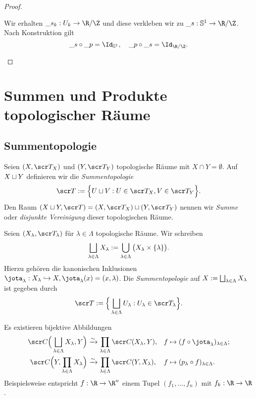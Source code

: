 \begin{ex}
\begin{proof}
\begin{seg}

			Wir erhalten $\_{s_k}: U_k \to \R / \Z$ und diese verkleben wir zu $\_s: \S^1 \to \R / \Z$.
			Nach Konstruktion gilt
			\[
				\_s \circ \_p = \Id_{\S^1}, \quad
				\_p \circ \_s = \Id_{\R / \Z}.
			\]
		\end{seg}
	\end{proof}
\end{ex}


\section{Summen und Produkte topologischer Räume} %


\subsection{Summentopologie}

\begin{df}
	Seien $(X, \scr T_X)$ und $(Y, \scr T_Y)$ topologische Räume mit $X \cap Y = \emptyset$.
	Auf $X \sqcup Y$ definieren wir die \emph{Summentopologie}
	\[
		\scr T
		:= \Big\{ U \dunion V : U \in \scr T_X, V \in \scr T_Y \Big\}.
	\]
	Den Raum $(X \dunion Y, \scr T) = (X, \scr T_X) \dunion (Y, \scr T_Y)$ nennen wir \emph{Summe} oder \emph{disjunkte Vereinigung} dieser topologischen Räume.
\end{df}

\begin{df}
	Seien $(X_\lambda, \scr T_\lambda)$ für $\lambda \in \Lambda$ topologische Räume.
	Wir schreiben
	\[
		\bigsqcup_{\lambda \in \Lambda} X_\lambda
		:= \bigcup_{\lambda \in \Lambda} \big( X_\lambda \times \{\lambda\} \big).
	\]
	Hierzu gehören die kanonischen Inklusionen $\jota_\lambda: X_\lambda \injto X, \jota_\lambda (x) = (x, \lambda)$.
	Die \emph{Summentopologie} auf $X := \bigsqcup_{\lambda \in \Lambda} X_\lambda$ ist gegeben durch
	\[
		\scr T
		:= \Big\{ \bigdunion_{\lambda \in \Lambda} U_\lambda : U_\lambda \in \scr T_\lambda \Big\}.
	\]
\end{df}

\begin{st}
	Es existieren bijektive Abbildungen
	\begin{align*}
		\scr C\Big(\bigdunion_{\lambda\in\Lambda} X_\lambda, Y\Big) &\bijto \prod_{\lambda \in \Lambda} \scr C(X_\lambda, Y), &
		f & \mapsto (f \circ \jota_\lambda)_{\lambda\in\Lambda}; \\
		\scr C\Big(Y, \prod_{\lambda\in\Lambda}X_\lambda\Big) &\bijto \prod_{\lambda\in\Lambda} \scr C(Y, X_\lambda), &
		f & \mapsto (p_\lambda \circ f)_{\lambda\in\Lambda}.
	\end{align*}
	Beispielsweise entspricht $f : \R \to \R^n$ einem Tupel $(f_1, \dotsc, f_n)$ mit $f_k : \R \to \R$.
\end{st}

